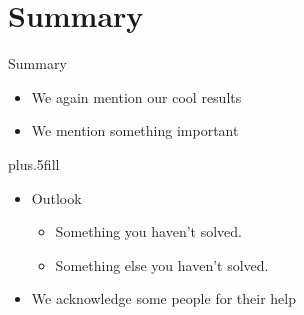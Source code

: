 \section*{Summary}
  \begin{frame}{Summary}
    \begin{itemize}
    \item[\cmark] We again mention our cool results
    \item We mention something important
    \end{itemize}
    
    \vskip0pt plus.5fill
    \begin{itemize}
    \item
      Outlook
      \begin{itemize}
      \item[\xmark]
        Something you haven't solved.
      \item
        Something else you haven't solved.
      \end{itemize}
    \item[\ding{43}] We acknowledge some people for their help
    \end{itemize}
  \end{frame}














































\appendix
